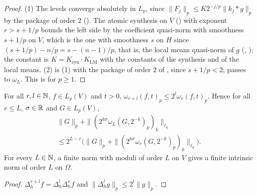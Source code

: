 \begin{proof}
\leanok
(1) The levels converge absolutely in $L_p$, since $\|F_j\|_p \leq K 2^{-j/p} \|k_j * g\|_p$ by
the package of order $2$ (). The atomic synthesis on $V$
()
with exponent $r > s + 1/p$ bounds the left side by the coefficient quasi-norm with smoothness
$s + 1/p$ on $V$, which is the one with smoothness $s$ on $H$ since
$(s + 1/p) - n/p = s - (n-1)/p$, that is, the local means quasi-norm of $g$
(, ); the constant is
$K = K_{\mathrm{syn}} \cdot K_{\mathrm{LM}}$ with the constants of the synthesis and of the local
means. (2) is (1) with the package of order $2$ of , since
$s + 1/p < 2$;  passes to $\omega_L$. This is
\cite[Theorem 4.10]{SchneiderVybiral} for $p \geq 1$.
\end{proof}

\begin{lemma}
\label{lem:moduli-orders}
\leanok
{}
For all $r, l \in \mathbb{N}$, $f \in L_p(V)$ and $t > 0$,
$\omega_{r + l}(f, t)_p \leq 2^l \omega_r(f, t)_p$. Hence for all $r \leq L$, $\sigma \in \mathbb{R}$ and
$G \in L_p(V)$,
\begin{multline*}
  \|G\|_p + \|(2^{k\sigma} \omega_L(G, 2^{-k})_p)_k\|_{\ell_q}
  \\ \leq 2^{L-r} \bigl(\|G\|_p + \|(2^{k\sigma} \omega_r(G, 2^{-k})_p)_k\|_{\ell_q}\bigr).
\end{multline*}
For every $L \in \mathbb{N}$, a finite norm with moduli of order $L$ on $V$ gives a finite intrinsic norm of
order $L$ on $\Omega$.
\end{lemma}

\begin{proof}
\leanok
$\Delta_h^{r + l} f = \Delta_h^l \Delta_h^r f$ and $\|\Delta_h^l g\|_p \leq 2^l \|g\|_p$.
\end{proof}

